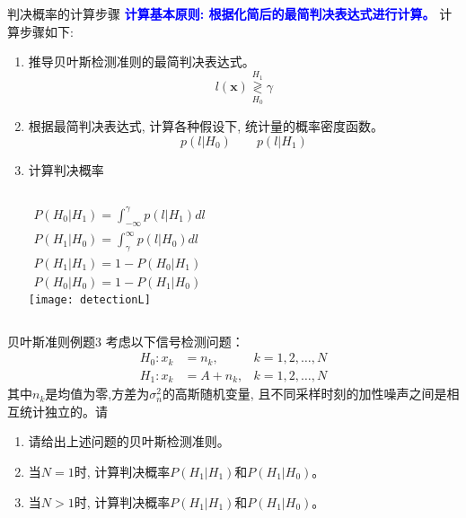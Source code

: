 \begin{frame}[shrink]{判决概率的计算步骤}
\textbf{\textcolor{blue}{计算基本原则: 根据化简后的最简判决表达式进行计算。}} 计算步骤如下:
\begin{enumerate}
	\item 推导贝叶斯检测准则的最简判决表达式。 \[l(\bm{x})\mathop{\gtrless}\limits_{H_0}^{H_1}\gamma \]
	\item 根据最简判决表达式, 计算各种假设下, 统计量的概率密度函数。
	\[p(l|H_0)\qquad p(l|H_1)\]
	\item 计算判决概率
	\begin{columns}
		\begin{align*}
		P(H_0|H_1)=\int_{-\infty}^{\gamma}p(l|H_1)dl\\
		P(H_1|H_0)=\int_{\gamma}^{\infty}p(l|H_0)dl\\
		P(H_1|H_1)=1-P(H_0|H_1)\\
		P(H_0|H_0)=1-P(H_1|H_0)
		\end{align*}
		\texttt{[image: detectionL]}
	\end{columns}
\end{enumerate}
\end{frame}

\begin{frame}{贝叶斯准则例题3}
考虑以下信号检测问题：
\begin{align*}
H_0: x_k&=n_{k},   & k=1,2,\dots,N\\
H_1: x_k&=A+n_{k}, & k=1,2,\dots,N
\end{align*}
其中$n_{k}$是均值为零,方差为$\sigma_n^2$的高斯随机变量,  且不同采样时刻的加性噪声之间是相互统计独立的。请\\
\begin{enumerate}
	\item 请给出上述问题的贝叶斯检测准则。
	\item 当$N=1$时, 计算判决概率$P(H_1|H_1)$和$P(H_1|H_0)$。
	\item 当$N>1$时, 计算判决概率$P(H_1|H_1)$和$P(H_1|H_0)$。
\end{enumerate}
\end{frame}


